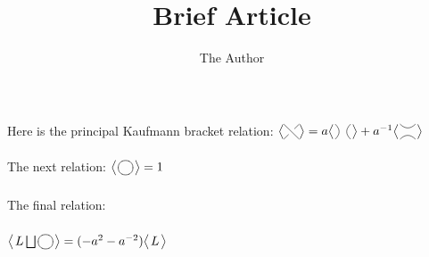\documentclass[12pt]{article}
\title{Brief Article}
\author{The Author}
\newif\ifpdf
\begin{document}
\ifpdf
\DeclareGraphicsExtensions{.pdf, .jpg, .tif}
\else
{}
\fi

\maketitle


Here is the principal Kaufmann bracket relation: 
$\bigl<
   \xygraph{              %
     !{0;/r1.0pc/:}
     [u(0.5)]
     !{\xunderv}
   }
 \bigr> 
 =
 a\bigl<\hspace{0.1pc} %
   \xygraph{
     !{0;/r1.0pc/:}
     [u(0.5)]
     !{\xunoverv}
   }\hspace{0.1pc}
 \bigr> 
 +
 a^{-1}\bigl<\hspace{0.1pc} %
 \xygraph{
  !{0;/r1.0pc/:}
       [u(0.5)]
  !{\xunoverh}
}\hspace{0.1pc}
\bigr>
 $

The next relation:
 $ \bigl<\hspace{0.1pc} 
 \xygraph{                          %
 !{0;/r1.0pc/:}
 !{\vcap-}
 !{\vcap+}
 }
 \hspace{0.1pc}
 \bigr>
 =1
 $
 
 The final relation:
 
 $
 \bigl<\hspace{0.1pc}
 L \bigsqcup 
  \xygraph{               %
 !{0;/r1.0pc/:}
 !{\vcap-}
 !{\vcap+}
 }
 \hspace{0.1pc}\bigr>
 =
 (-a^{2}-a^{-2})\bigr<\hspace{0.1pc}L\hspace{0.1pc}\bigr>$

 
\end{document}
